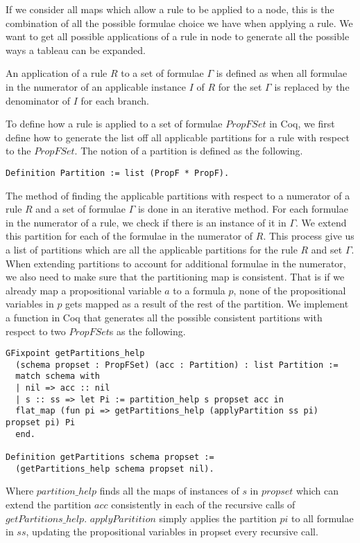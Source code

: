 If we consider all maps which allow a rule to be applied to a node, this is the
combination of all the possible formulae choice we have when applying a rule.
We want to get all possible applications of a rule in node to generate all the
possible ways a tableau can be expanded.

An application of a rule $R$ to a set of formulae $\Gamma$ is defined as when
all formulae in the numerator of an applicable instance $I$ of $R$ for the set
$\Gamma$ is replaced by the denominator of $I$ for each branch.

To define how a rule is applied to a set of formulae $PropFSet$ in Coq, we
first define how to generate the list off all applicable partitions for a rule
with respect to the $PropFSet$. The notion of a partition is defined as the
following.

\begin{lstlisting}
Definition Partition := list (PropF * PropF).
\end{lstlisting}

The method of finding the applicable partitions with respect to a numerator of
a rule $R$ and a set of formulae $\Gamma$ is done in an iterative method. For
each formulae in the numerator of a rule, we check if there is an instance of
it in $\Gamma$. We extend this partition for each of the formulae in the
numerator of $R$. This process give us a list of partitions which are all the
applicable partitions for the rule $R$ and set $\Gamma$. When extending
partitions to account for additional formulae in the numerator, we also need to
make sure that the partitioning map is consistent. That is if we already map a
propositional variable $a$ to a formula $p$, none of the propositional
variables in $p$ gets mapped as a result of the rest of the partition.  We
implement a function in Coq that generates all the possible consistent
partitions with respect to two $PropFSet$s as the following.

\begin{lstlisting}
GFixpoint getPartitions_help
  (schema propset : PropFSet) (acc : Partition) : list Partition :=
  match schema with
  | nil => acc :: nil
  | s :: ss => let Pi := partition_help s propset acc in
  flat_map (fun pi => getPartitions_help (applyPartition ss pi) propset pi) Pi
  end.

Definition getPartitions schema propset :=
  (getPartitions_help schema propset nil).
\end{lstlisting}

Where $partition\_help$ finds all the maps of instances of $s$ in $propset$ 
which can extend the partition $acc$ consistently in each of the recursive 
calls of $getPartitions\_help$. $applyParitition$ simply applies the partition
$pi$ to all formulae in $ss$, updating the propositional variables in propset
every recursive call.

